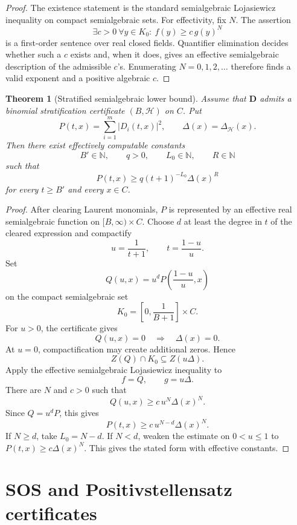 \documentclass[11pt]{article}
\newtheorem{theorem}{Theorem}[section]
\begin{document}
\begin{proof}
The existence statement is the standard semialgebraic Lojasiewicz inequality on compact semialgebraic sets. For effectivity, fix \(N\). The assertion
\[
\exists c>0\ \forall y\in K_0:\ f(y)\ge c\,g(y)^N
\]
is a first-order sentence over real closed fields. Quantifier elimination decides whether such a \(c\) exists and, when it does, gives an effective semialgebraic description of the admissible \(c\)'s. Enumerating \(N=0,1,2,\ldots\) therefore finds a valid exponent and a positive algebraic \(c\).
\end{proof}

\begin{theorem}[Stratified semialgebraic lower bound]
Assume that \(\mathbf D\) admits a binomial stratification certificate \((B,\mathcal H)\) on \(C\). Put
\[
P(t,x)=\sum_{i=1}^m |D_i(t,x)|^2,
\qquad
\Delta(x)=\Delta_{\mathcal H}(x).
\]
Then there exist effectively computable constants
\[
B'\in\mathbb N,
\qquad
q>0,
\qquad
L_0\in\mathbb N,
\qquad
R\in\mathbb N
\]
such that
\[
P(t,x)\ge q(t+1)^{-L_0}\Delta(x)^R
\]
for every \(t\ge B'\) and every \(x\in C\).
\end{theorem}

\begin{proof}
After clearing Laurent monomials, \(P\) is represented by an effective real semialgebraic function on \([B,\infty)\times C\). Choose \(d\) at least the degree in \(t\) of the cleared expression and compactify
\[
u=\frac1{t+1},
\qquad
t=\frac{1-u}{u}.
\]
Set
\[
Q(u,x)=u^dP\left(\frac{1-u}{u},x\right)
\]
on the compact semialgebraic set
\[
K_0=\left[0,\frac1{B+1}\right]\times C.
\]
For \(u>0\), the certificate gives
\[
Q(u,x)=0
\quad\Longrightarrow\quad
\Delta(x)=0.
\]
At \(u=0\), compactification may create additional zeros. Hence
\[
Z(Q)\cap K_0\subseteq Z(u\Delta).
\]
Apply the effective semialgebraic Lojasiewicz inequality to
\[
f=Q,
\qquad
g=u\Delta.
\]
There are \(N\) and \(c>0\) such that
\[
Q(u,x)\ge c\,u^N\Delta(x)^N.
\]
Since \(Q=u^dP\), this gives
\[
P(t,x)\ge c\,u^{N-d}\Delta(x)^N.
\]
If \(N\ge d\), take \(L_0=N-d\). If \(N<d\), weaken the estimate on \(0<u\le1\) to \(P(t,x)\ge c\Delta(x)^N\). This gives the stated form with effective constants.
\end{proof}

\section{SOS and Positivstellensatz certificates}
\end{document}
